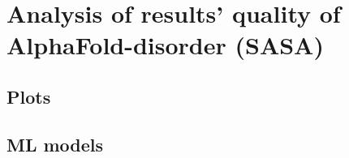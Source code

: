 \chapter{Analysis of results' quality of AlphaFold-disorder (SASA)}
\label{chp:analysis}

\section{Plots}
\section{ML models}